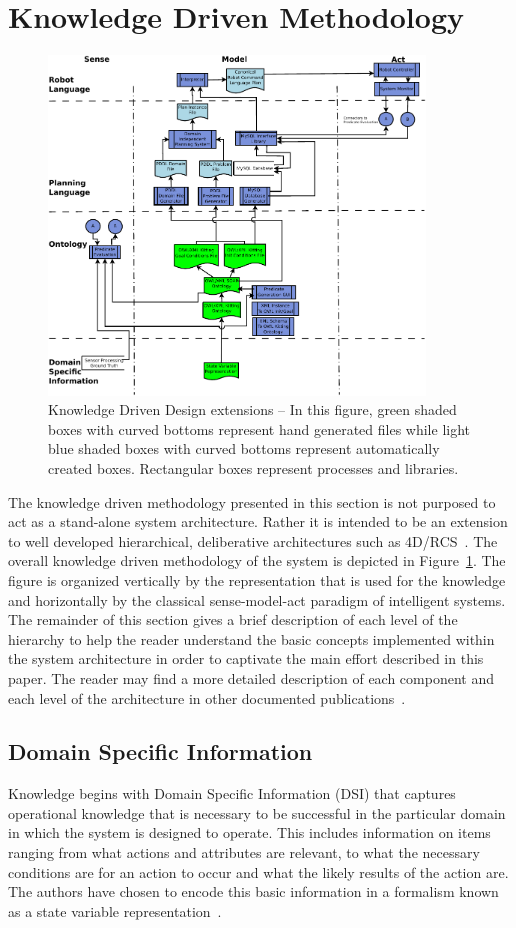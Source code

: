\section{Knowledge Driven Methodology}
\label{sect:architecture}
\begin{figure}[!t!h!b!]
\centering
\includegraphics[width=10cm]{images/KnowledgeDrivenRobotics.pdf}
\caption{Knowledge Driven Design extensions -- In this figure, green shaded
  boxes with curved bottoms represent hand generated files while light blue
  shaded boxes with curved bottoms represent automatically created boxes.
  Rectangular boxes represent processes and libraries. }
\label{fig:methodology}
\end{figure}

The knowledge driven methodology presented in this section is not purposed
to act as a stand-alone system architecture. Rather it is intended to be an
extension to well developed hierarchical, deliberative architectures such
as 4D/RCS~\cite{Albus2000}. The overall knowledge driven methodology of the
system is depicted in Figure~\ref{fig:methodology}. The figure is organized
vertically by the representation that is used for the knowledge and
horizontally by the classical sense-model-act paradigm of intelligent
systems. The remainder of this section gives a brief description of each
level of the hierarchy to help the reader understand the basic concepts
implemented within the system architecture in order to captivate the main effort described in this paper. The reader may find a more
detailed description of each component and each level of the architecture
in other documented
publications~\cite{BALAKIRSKY.IROS.2012}.

\subsection{Domain Specific Information}
Knowledge begins with Domain Specific Information
(DSI) that captures operational knowledge that is necessary to be
successful in the particular domain in which the system is designed to
operate. This includes information on items ranging from what actions and
attributes are relevant, to what the necessary conditions are for an action
to occur and what the likely results of the action are. The authors have
chosen to encode this basic information in a formalism known as a state
variable representation~\cite{NAU.2004}.

